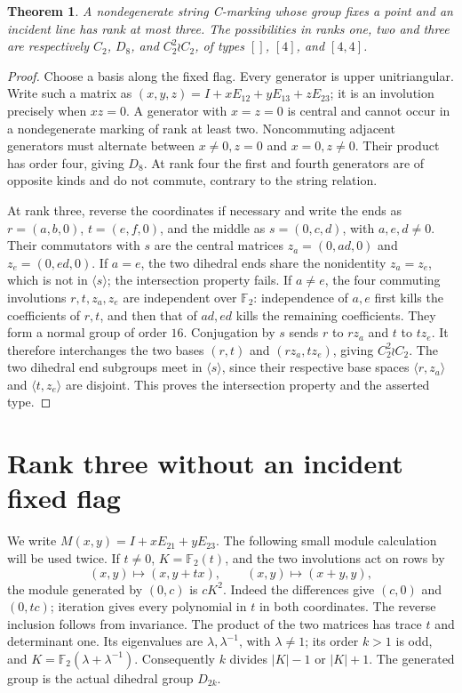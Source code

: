 \documentclass[11pt]{article}
\newtheorem{theorem}{Theorem}
\newcommand{\F}{\mathbb F}
\begin{document}
\begin{theorem}\label{triangular}
A nondegenerate string C-marking whose group fixes a point and an
incident line has rank at most three. The possibilities in ranks one,
two and three are respectively $C_2$, $D_8$, and $C_2^2\wr C_2$, of
types $[]$, $[4]$, and $[4,4]$.
\end{theorem}
\begin{proof}
Choose a basis along the fixed flag. Every generator is upper unitriangular.
Write such a matrix as $(x,y,z)=I+xE_{12}+yE_{13}+zE_{23}$; it is an
involution precisely when $xz=0$. A generator with $x=z=0$ is central and
cannot occur in a nondegenerate marking of rank at least two. Noncommuting
adjacent generators must alternate between $x\ne0,z=0$ and $x=0,z\ne0$.
Their product has order four, giving $D_8$. At rank four the first and
fourth generators are of opposite kinds and do not commute, contrary to
the string relation.

At rank three, reverse the coordinates if necessary and write the ends
as $r=(a,b,0)$, $t=(e,f,0)$, and the middle as $s=(0,c,d)$, with
$a,e,d\ne0$. Their commutators with $s$ are the central matrices
$z_a=(0,ad,0)$ and $z_e=(0,ed,0)$. If $a=e$, the two dihedral ends
share the nonidentity $z_a=z_e$, which is not in $\langle s\rangle$;
the intersection property fails. If $a\ne e$, the four commuting
involutions $r,t,z_a,z_e$ are independent over $\F_2$: independence of
$a,e$ first kills the coefficients of $r,t$, and then that of $ad,ed$
kills the remaining coefficients. They form a normal group of order
$16$. Conjugation by $s$ sends $r$ to $rz_a$ and $t$ to $tz_e$.
It therefore interchanges the two bases $(r,t)$ and $(rz_a,tz_e)$,
giving $C_2^2\wr C_2$. The two dihedral end subgroups meet in
$\langle s\rangle$, since their respective base spaces
$\langle r,z_a\rangle$ and $\langle t,z_e\rangle$ are disjoint.
This proves the intersection property and the asserted type.
\end{proof}

\section*{Rank three without an incident fixed flag}
We write $M(x,y)=I+xE_{21}+yE_{23}$. The following small module
calculation will be used twice. If $t\ne0$, $K=\F_2(t)$, and the two
involutions act on rows by
\[
 (x,y)\longmapsto(x,y+t x),\qquad
 (x,y)\longmapsto(x+y,y),
\]
the module generated by $(0,c)$ is $cK^2$. Indeed the differences
give $(c,0)$ and $(0,tc)$; iteration gives every polynomial in $t$
in both coordinates. The reverse inclusion follows from invariance.
The product of the two matrices has trace $t$ and determinant one.
Its eigenvalues are $\lambda,\lambda^{-1}$, with $\lambda\ne1$;
its order $k>1$ is odd, and $K=\F_2(\lambda+\lambda^{-1})$.
Consequently $k$ divides $|K|-1$ or $|K|+1$. The generated group is
the actual dihedral group $D_{2k}$.
\end{document}
